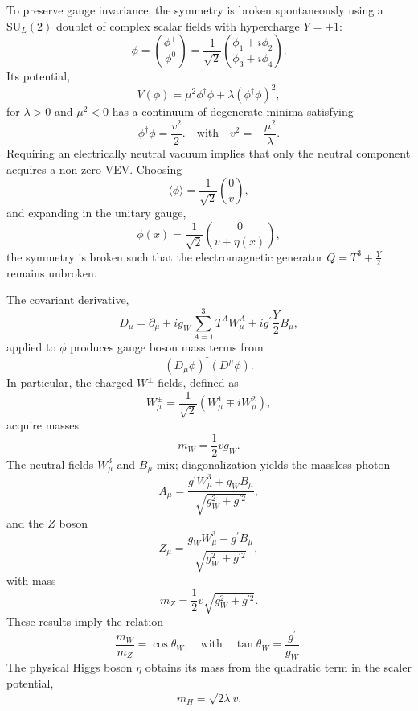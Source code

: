 To preserve gauge invariance, the symmetry is broken spontaneously using a $\mathrm{SU}_L(2)$ doublet of complex scalar fields with hypercharge $Y=+1$:
\begin{equation}
\phi= \binom{\phi^+}{\phi^0} = \frac{1}{\sqrt{2}}\binom{\phi_1+i\phi_2}{\phi_3+i\phi_4}.
\end{equation}
Its potential,
\begin{equation}
V(\phi)=\mu^2\phi^\dagger\phi+\lambda(\phi^\dagger\phi)^2,
\end{equation}
for $\lambda>0$ and $\mu^2<0$ has a continuum of degenerate minima satisfying
\begin{equation}
\phi^\dagger\phi=\frac{v^2}{2}. \quad \mathrm{with} \quad v^2=-\frac{\mu^2}{\lambda}.
\end{equation}
Requiring an electrically neutral vacuum implies that only the neutral component acquires a non-zero VEV. Choosing
\begin{equation}
\langle \phi \rangle = \frac{1}{\sqrt{2}} \binom{0}{v},
\end{equation}
and expanding in the unitary gauge,
\begin{equation}
\phi(x)=\frac{1}{\sqrt{2}} \binom{0}{v+\eta(x)},
\end{equation}
the symmetry is broken such that the electromagnetic generator $Q=T^3+\frac{Y}{2}$ remains unbroken.

The covariant derivative,
\begin{equation}
D_\mu = \partial_\mu + ig_W \sum_{A=1}^3 T^A W_\mu^A + ig^\prime \frac{Y}{2}B_\mu,
\end{equation}
applied to $\phi$ produces gauge boson mass terms from
\begin{equation}
(D_\mu\phi)^\dagger(D^\mu\phi).
\end{equation}
In particular, the charged $W^\pm$ fields, defined as
\begin{equation}
W^\pm_\mu = \frac{1}{\sqrt{2}}(W_\mu^1 \mp iW_\mu^2),
\end{equation}
acquire masses
\begin{equation}
m_W=\frac{1}{2}vg_W.
\end{equation}
The neutral fields $W_\mu^3$ and $B_\mu$ mix; diagonalization yields the massless photon
\begin{equation}
A_\mu = \frac{g^\prime W_\mu^3 + g_W B_\mu}{\sqrt{g_W^2+g^{\prime 2}}},
\end{equation}
and the $Z$ boson
\begin{equation}
Z_\mu = \frac{g_W W_\mu^3 - g^\prime B_\mu}{\sqrt{g_W^2+g^{\prime 2}}},
\end{equation}
with mass
\begin{equation}
m_Z = \frac{1}{2}v\sqrt{g_W^2+g^{\prime 2}}.
\end{equation}
These results imply the relation
\begin{equation}
\frac{m_W}{m_Z}=\cos \theta_W, \quad \mathrm{with} \quad \tan \theta_W=\frac{g^\prime}{g_W}.
\end{equation}
The physical Higgs boson $\eta$ obtains its mass from the quadratic term in the scaler potential,
\begin{equation}
m_H=\sqrt{2\lambda}v.
\end{equation}

